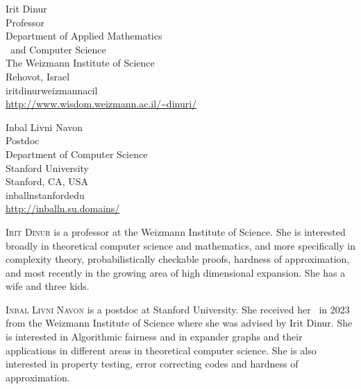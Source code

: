 \documentclass{toc}
\begin{document}
%
%
%
%
%
\begin{tocauthors}
\begin{tocinfo}[Dinur]
 Irit Dinur\\
 Professor\\
 Department of Applied Mathematics\\
 \ and Computer Science\\
 The Weizmann Institute of Science\\
 Rehovot, Israel\\
 irit\tocdot{}dinur\tocat{}weizmann\tocdot{}ac\tocdot{}il\\   %
 \url{http://www.wisdom.weizmann.ac.il/~dinuri/}      %
\end{tocinfo}
\begin{tocinfo}[Navon]   %
  Inbal Livni Navon\\
  Postdoc\\
  Department of Computer Science\\
  Stanford University\\
  Stanford, CA, USA\\
  inballn\tocat{}stanford\tocdot{}edu\\
  \url{http://inballn.su.domains/}
\end{tocinfo}
\end{tocauthors}

%
%
%
%
%
%
%
%
%
%
%
%
%
%
\begin{tocaboutauthors}
\begin{tocabout}[Dinur]  %
  \textsc{Irit Dinur}  is a professor at the Weizmann Institute of Science. She is interested broadly in theoretical computer science and mathematics, and more specifically in complexity theory, probabilistically checkable proofs, hardness of approximation, and most recently in the growing area of high dimensional expansion. She has a wife and three kids.   
\end{tocabout}
\begin{tocabout}
\textsc{Inbal Livni Navon} is a postdoc at Stanford University.
%
She received her \phd\ in 2023 from the
Weizmann Institute of Science where she was advised by Irit Dinur. %
%
She is interested in Algorithmic fairness and in expander graphs and their applications in different areas in theoretical computer science. She is also interested in property testing, error correcting codes and hardness of approximation. 
%
%
%
%
%
\end{tocabout}
\end{tocaboutauthors}
\end{document}
